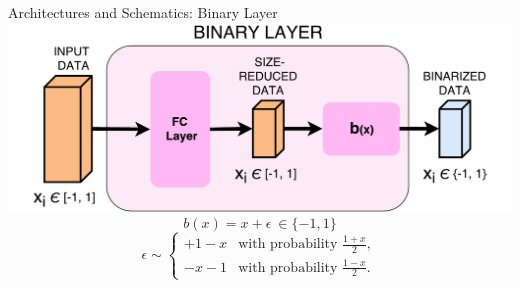 \documentclass[10pt]{beamer}
\begin{document}
\begin{frame}{Architectures and Schematics: Binary Layer}
  \includegraphics[width=\linewidth]{./img/binarizator.pdf}
  \begin{equation*}
    b(x) = x + \epsilon \ \in \{-1,1\}
  \end{equation*}
  \begin{equation*}
    \epsilon \sim \begin{cases} +1 - x & \mbox{with probability } \frac{1+x}{2}, \\ -x - 1 & \mbox{with probability } \frac{1-x}{2}.\end{cases}
  \end{equation*}
  \begin{figure}
    \begin{minipage}{\textwidth}
             \\
    \end{minipage}
  \end{figure}

\end{frame}
\end{document}
